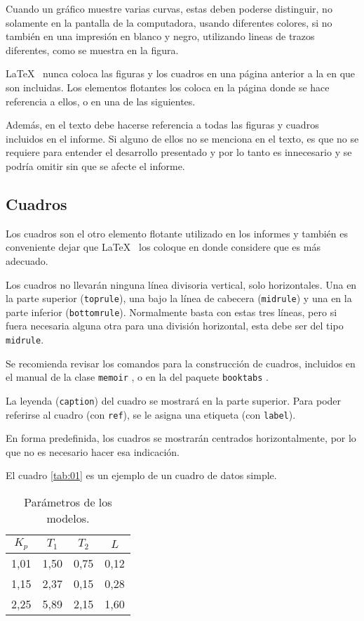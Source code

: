 Cuando un gráfico muestre varias curvas, estas deben poderse distinguir, no solamente en la pantalla de la computadora, usando diferentes colores, si no también en una impresión en blanco y negro, utilizando lineas de trazos diferentes, como se muestra en la figura.

\LaTeX~ nunca coloca las figuras y los cuadros en una página anterior a la en que son incluidas.  Los elementos flotantes los coloca en la página donde se hace referencia a ellos, o en una de las siguientes.

Además, en el texto debe hacerse referencia a todas las figuras y cuadros incluidos en el informe.  Si alguno de ellos no se menciona en el texto, es que no se requiere para entender el desarrollo presentado y por lo tanto es innecesario y se podría omitir sin que se afecte el informe.

\subsection{Cuadros}
Los cuadros son el otro elemento flotante utilizado en los informes y también es conveniente dejar que \LaTeX~ los coloque en donde considere que es más adecuado.

Los cuadros no llevarán ninguna línea divisoria vertical, solo horizontales. Una en la parte superior (\texttt{toprule}), una bajo la línea de cabecera (\texttt{midrule}) y una en la parte inferior (\texttt{bottomrule}).  Normalmente basta con estas tres líneas, pero si fuera necesaria alguna otra para una división horizontal, esta debe ser del tipo \texttt{midrule}.

Se recomienda revisar los comandos para la construcción de cuadros, incluidos en el manual de la clase \texttt{memoir} \cite{memoir2011}, o en la del paquete \texttt{booktabs} \cite{fear2005}.

La leyenda (\texttt{caption}) del cuadro se mostrará en la parte superior.  Para poder referirse al cuadro (con \texttt{ref}), se le asigna una etiqueta (con \texttt{label}).

En forma predefinida, los cuadros se mostrarán centrados horizontalmente, por lo que no es necesario hacer esa indicación. 

El cuadro \ref{tab:01} es un ejemplo de un cuadro de datos simple.

\begin{table}
\caption{Parámetros de los modelos.} \label{tab:01o}
		\begin{tabular}{@{}*{4}{c}@{}}
    \toprule
    $K_p$ & $T_1$ & $T_2$ & $L$ \\
    \midrule
     1,01 & 1,50 & 0,75 & 0,12 \\
		 1,15 & 2,37 & 0,15 & 0,28 \\
		 2,25 & 5,89 & 2,15 & 1,60 \\
    \bottomrule
    \end{tabular}
\end{table}

